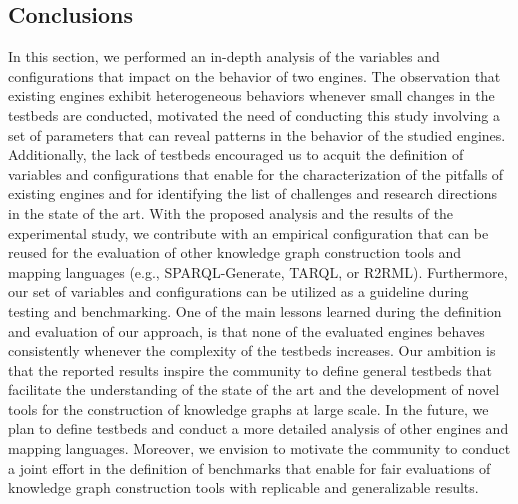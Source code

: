 \subsection{Conclusions}
In this section, we performed an in-depth analysis of the variables and configurations that impact on the behavior of two engines. The observation that existing engines exhibit heterogeneous behaviors whenever small changes in the testbeds are conducted, motivated the need of conducting this study involving a set of parameters that can reveal patterns in the behavior of the studied engines. Additionally, the lack of testbeds encouraged us to acquit the definition of variables and configurations that enable for the characterization of the pitfalls of existing engines and for identifying the list of challenges and research directions in the state of the art. 
With the proposed analysis and the results of the experimental study, we contribute with an empirical configuration that can be reused for the evaluation of other knowledge graph construction tools and mapping languages (e.g., SPARQL-Generate, TARQL, or R2RML). Furthermore, our set of variables and configurations can be utilized as a guideline during testing and benchmarking. One of the main lessons learned during the definition and evaluation of our approach, is that none of the evaluated engines behaves consistently whenever the complexity of the testbeds increases. Our ambition is that the reported results inspire the community to define general testbeds that facilitate the understanding of the state of the art and the development of novel tools for the construction of knowledge graphs at large scale.  In the future, we plan to define testbeds and conduct a more detailed analysis of other engines and mapping languages. Moreover, we envision to motivate the community to conduct a joint effort in the definition of benchmarks that enable for fair evaluations of knowledge graph construction tools with replicable and generalizable results. 



